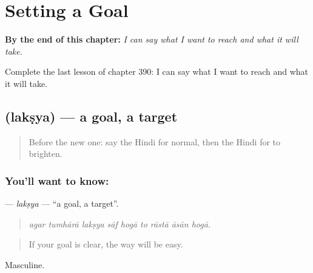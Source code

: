 
\chapter{Setting a Goal}
\label{ch:hi-setting-a-goal}

\begin{chapteropening}
\textbf{By the end of this chapter:} \emph{I can say what I want to reach and what it will take.}

Complete the last lesson of chapter 390: I can say what I want to reach and what it will take.
\end{chapteropening}

\section[\texorpdfstring{\hi{लक्ष्य} (lakṣya)}{लक्ष्य (lakṣya)}]{ (lakṣya) — a goal, a target}

\label{lesson:HI-C390-laksya}



\begin{quote}
Before the new one: say the Hindi for normal, then the Hindi for to brighten.
\end{quote}

\subsection*{You'll want to know: }
\textbf{} — \emph{lakṣya} — \textquotedblleft{}a goal, a target\textquotedblright{}.

\begin{quote}
        
\end{quote}

\begin{quote}
\emph{agar tumhārā lakṣya sāf hogā to rāstā āsān hogā.}
\end{quote}

\begin{quote}
If your goal is clear, the way will be easy.
\end{quote}

Masculine.

